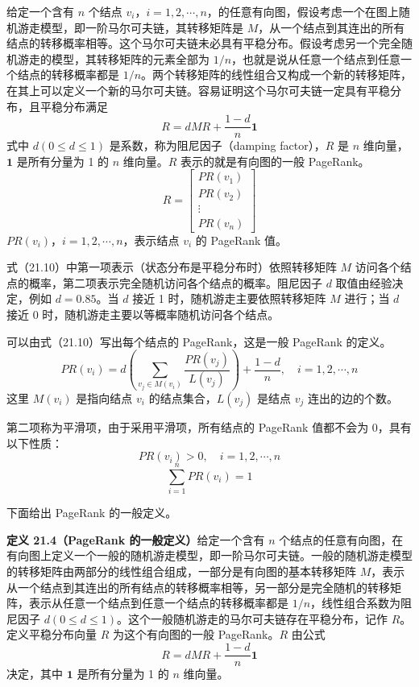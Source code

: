 \documentclass[UTF8,12pt,a4paper,fontset=fandol]{ctexart}
\begin{document}
给定一个含有 $n$ 个结点 $v_i$，$i=1,2,\cdots,n$，的任意有向图，假设考虑一个在图上随机游走模型，即一阶马尔可夫链，其转移矩阵是 $M$，从一个结点到其连出的所有结点的转移概率相等。这个马尔可夫链未必具有平稳分布。假设考虑另一个完全随机游走的模型，其转移矩阵的元素全部为 $1/n$，也就是说从任意一个结点到任意一个结点的转移概率都是 $1/n$。两个转移矩阵的线性组合又构成一个新的转移矩阵，在其上可以定义一个新的马尔可夫链。容易证明这个马尔可夫链一定具有平稳分布，且平稳分布满足
\begin{equation}
R=dMR+\frac{1-d}{n}\mathbf{1}
\tag{21.10}
\end{equation}
式中 $d(0\leqslant d\leqslant 1)$ 是系数，称为阻尼因子（damping factor），$R$ 是 $n$ 维向量，$\mathbf{1}$ 是所有分量为 1 的 $n$ 维向量。$R$ 表示的就是有向图的一般 PageRank。
\[
R=
\begin{bmatrix}
PR(v_1)\\
PR(v_2)\\
\vdots\\
PR(v_n)
\end{bmatrix}
\]
$PR(v_i)$，$i=1,2,\cdots,n$，表示结点 $v_i$ 的 PageRank 值。

式（21.10）中第一项表示（状态分布是平稳分布时）依照转移矩阵 $M$ 访问各个结点的概率，第二项表示完全随机访问各个结点的概率。阻尼因子 $d$ 取值由经验决定，例如 $d=0.85$。当 $d$ 接近 1 时，随机游走主要依照转移矩阵 $M$ 进行；当 $d$ 接近 0 时，随机游走主要以等概率随机访问各个结点。

可以由式（21.10）写出每个结点的 PageRank，这是一般 PageRank 的定义。
\begin{equation}
PR(v_i)=d\left(\sum_{v_j\in M(v_i)}\frac{PR(v_j)}{L(v_j)}\right)+\frac{1-d}{n},\quad i=1,2,\cdots,n
\tag{21.11}
\end{equation}
这里 $M(v_i)$ 是指向结点 $v_i$ 的结点集合，$L(v_j)$ 是结点 $v_j$ 连出的边的个数。

第二项称为平滑项，由于采用平滑项，所有结点的 PageRank 值都不会为 0，具有以下性质：
\begin{equation}
PR(v_i)>0,\quad i=1,2,\cdots,n
\tag{21.12}
\end{equation}
\begin{equation}
\sum_{i=1}^n PR(v_i)=1
\tag{21.13}
\end{equation}

下面给出 PageRank 的一般定义。

\noindent\textbf{定义 21.4（PageRank 的一般定义）}\quad 给定一个含有 $n$ 个结点的任意有向图，在有向图上定义一个一般的随机游走模型，即一阶马尔可夫链。一般的随机游走模型的转移矩阵由两部分的线性组合组成，一部分是有向图的基本转移矩阵 $M$，表示从一个结点到其连出的所有结点的转移概率相等，另一部分是完全随机的转移矩阵，表示从任意一个结点到任意一个结点的转移概率都是 $1/n$，线性组合系数为阻尼因子 $d(0\leqslant d\leqslant 1)$。这个一般随机游走的马尔可夫链存在平稳分布，记作 $R$。定义平稳分布向量 $R$ 为这个有向图的一般 PageRank。$R$ 由公式
\begin{equation}
R=dMR+\frac{1-d}{n}\mathbf{1}
\tag{21.14}
\end{equation}
决定，其中 $\mathbf{1}$ 是所有分量为 1 的 $n$ 维向量。
\end{document}
